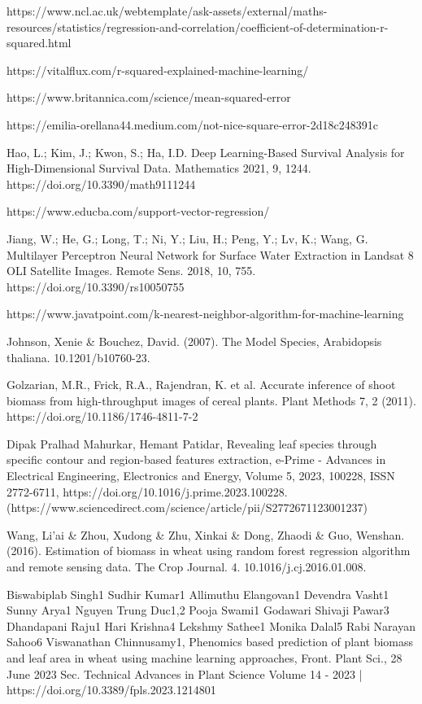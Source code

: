 \documentclass[a4paper,12pt]{report}%
\renewcommand{\\}{\vspace*{0.5\baselineskip} \newline}
\begin{document}
\begin{thebibliography}{1}
https://www.ncl.ac.uk/webtemplate/ask-assets/external/maths-resources/statistics/regression-and-correlation/coefficient-of-determination-r-squared.html

https://vitalflux.com/r-squared-explained-machine-learning/

https://www.britannica.com/science/mean-squared-error

https://emilia-orellana44.medium.com/not-nice-square-error-2d18c248391c

Hao, L.; Kim, J.; Kwon, S.; Ha, I.D. Deep Learning-Based Survival Analysis for High-Dimensional Survival Data. Mathematics 2021, 9, 1244. https://doi.org/10.3390/math9111244

https://www.educba.com/support-vector-regression/

Jiang, W.; He, G.; Long, T.; Ni, Y.; Liu, H.; Peng, Y.; Lv, K.; Wang, G. Multilayer Perceptron Neural Network for Surface Water Extraction in Landsat 8 OLI Satellite Images. Remote Sens. 2018, 10, 755. https://doi.org/10.3390/rs10050755

https://www.javatpoint.com/k-nearest-neighbor-algorithm-for-machine-learning

Johnson, Xenie & Bouchez, David. (2007). The Model Species, Arabidopsis thaliana. 10.1201/b10760-23. 

Golzarian, M.R., Frick, R.A., Rajendran, K. et al. Accurate inference of shoot biomass from high-throughput images of cereal plants. Plant Methods 7, 2 (2011). https://doi.org/10.1186/1746-4811-7-2

Dipak Pralhad Mahurkar, Hemant Patidar,
Revealing leaf species through specific contour and region-based features extraction,
e-Prime - Advances in Electrical Engineering, Electronics and Energy,
Volume 5,
2023,
100228,
ISSN 2772-6711,
https://doi.org/10.1016/j.prime.2023.100228.
(https://www.sciencedirect.com/science/article/pii/S2772671123001237)


Wang, Li’ai \& Zhou, Xudong \& Zhu, Xinkai \& Dong, Zhaodi \& Guo, Wenshan. (2016). Estimation of biomass in wheat using random forest regression algorithm and remote sensing data. The Crop Journal. 4. 10.1016/j.cj.2016.01.008.


Biswabiplab Singh1 Sudhir Kumar1 Allimuthu Elangovan1 Devendra Vasht1 Sunny Arya1 Nguyen Trung Duc1,2 Pooja Swami1 Godawari Shivaji Pawar3 Dhandapani Raju1 Hari Krishna4 Lekshmy Sathee1 Monika Dalal5 Rabi Narayan Sahoo6 Viswanathan Chinnusamy1,
Phenomics based prediction of plant biomass and leaf area in wheat using machine learning approaches,
Front. Plant Sci., 28 June 2023
Sec. Technical Advances in Plant Science
Volume 14 - 2023 | https://doi.org/10.3389/fpls.2023.1214801



\end{thebibliography}
\end{document}
